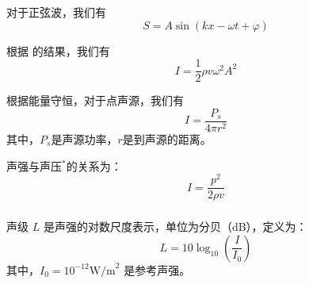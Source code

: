 对于正弦波，我们有
\[
    S=A\sin(kx-\omega t+\varphi)
\]

根据  的结果，我们有
\[
    I=\frac{1}{2}\rho v\omega^2 A^2
\]

根据能量守恒，对于点声源，我们有
\[
    I=\frac{P_s}{4\pi r^2}
\]
其中，\(P_s\)是声源功率，\(r\)是到声源的距离。

声强与声压$^*$的关系为：
\[
    I = \frac{p^2}{2\rho v}
\]

\subsubsection[声级]{}
声级 \(L\) 是声强的对数尺度表示，单位为分贝（dB），定义为：
\[
    L = 10 \log_{10}\left(\frac{I}{I_0}\right)
\]
其中，\(I_0 = 10^{-12} \text{W/m}^2\) 是参考声强。

